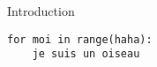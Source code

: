 \begin{section}{Introduction}
	\begin{lstlisting}[caption=ceci est un test, captionpos=b]
for moi in range(haha):
	je suis un oiseau
\end{lstlisting}
\end{section}
